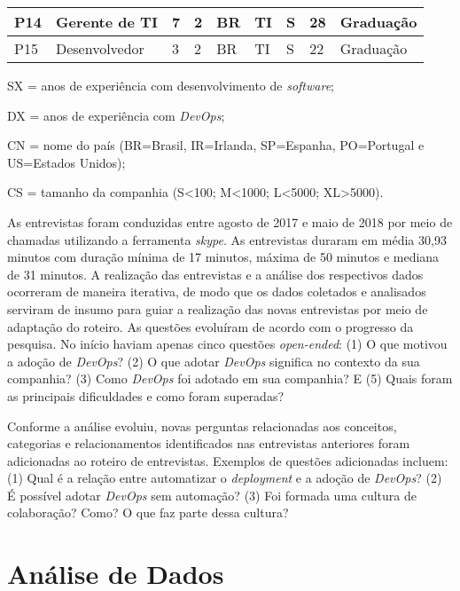 \begin{table}[t]
\begin{tabular}{|p{0.6cm}|p{3.4cm}|p{0.5cm}|p{0.5cm}|p{0.5cm}|p{1.7cm}|p{0.5cm}|p{1cm}|p{2.7cm}|}
P14 & Gerente de \acrshort{TI} & 7 & 2 & BR & \acrshort{TI} & S & 28 & Graduação \\ \hline \centering

P15 & Desenvolvedor & 3 & 2 & BR & \acrshort{TI} & S & 22 & Graduação \\ \hline
\end{tabular}
\begin{tablenotes}
  \footnotesize \centering
  \item SX = anos de experiência com desenvolvimento de {\it software};
  \item DX = anos de experiência com {\it DevOps};
  \item CN = nome do país (BR=Brasil, IR=Irlanda, SP=Espanha, PO=Portugal e US=Estados Unidos);
  \item CS = tamanho da companhia (S\textless100; M\textless1000; L\textless5000; XL\textgreater5000).
\end{tablenotes}
\end{table}


As entrevistas foram conduzidas entre agosto de 2017 e maio de 2018 por meio de
chamadas utilizando a ferramenta {\it skype}. As entrevistas duraram em média 30,93 minutos
com duração mínima de 17 minutos, máxima de 50 minutos e mediana de 31 minutos.
A realização das entrevistas e a análise dos respectivos dados ocorreram de
maneira iterativa, de modo que os dados coletados e analisados serviram de
insumo para guiar a realização das novas entrevistas por meio de adaptação do
roteiro. As questões evoluíram de acordo com o progresso da pesquisa. No início
haviam apenas cinco questões {\it open-ended}: (1) O que motivou a adoção de
{\it DevOps}? (2) O que adotar {\it DevOps} significa no contexto da sua
companhia? (3) Como {\it DevOps} foi adotado em sua companhia? E (5) Quais foram
as principais dificuldades e como foram superadas?

Conforme a análise evoluiu, novas perguntas relacionadas aos
conceitos, categorias e relacionamentos identificados nas entrevistas anteriores
foram adicionadas ao roteiro de entrevistas.
Exemplos de questões adicionadas incluem: (1) Qual é a relação entre automatizar o
{\it deployment} e a adoção de {\it DevOps}? (2) É possível adotar {\it DevOps}
sem automação? (3) Foi formada uma cultura de colaboração? Como? O que faz parte
dessa cultura?

\section{Análise de Dados}

